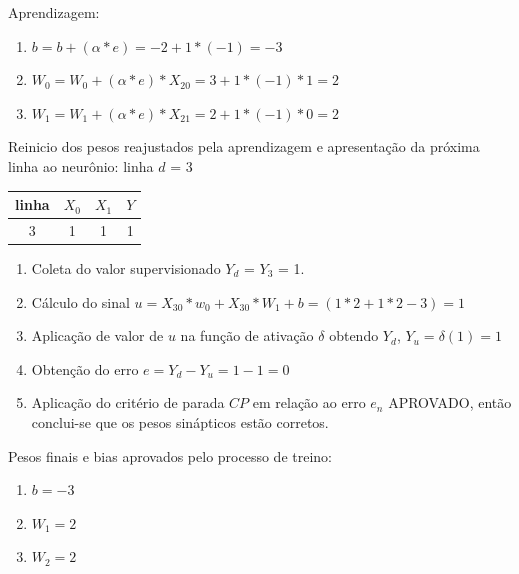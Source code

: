 \documentclass[	12pt, Times, openright, twoside, a4paper, english, brazil]{abntex2}
\begin{document}
            	
            	Aprendizagem:
            	\begin{enumerate}
            		\item $b=b+(\alpha*e) = -2 + 1*(-1) = -3 $  					
            		\item $W_0=W_0 + (\alpha*e)*X_{20} = 3 + 1*(-1)*1 = 2$ 
            		\item $W_1=W_1 + (\alpha*e)*X_{21}= 2 + 1*(-1)*0 = 2$
            	\end{enumerate}	
            	
            	Reinicio dos pesos reajustados pela aprendizagem e apresentação da próxima linha ao neurônio:
    				linha $d$ = 3\\
    				\begin{table}[!ht]
                    \centering
    				\begin{tabular}{|c|c|c|c|}
    					\hline  \textbf{linha} & \textbf{$X_0$} & \textbf{$X_1$} &  \textbf{$Y$}\\
  				 	    \hline 3 & 1 & 1 & 1\\ \hline
    				\end{tabular}
    				\end{table}
            	
            	\begin{enumerate}
            	    \item Coleta do valor supervisionado $Y_d$ = $Y_3$ = 1.
            		\item Cálculo do sinal $u = X_{30}*w_0 + X_{30}*W_1 +b = (1*2 + 1*2 -3) = 1$
            		\item Aplicação de valor de $u$ na função de ativação $\delta$ obtendo $Y_d$, $Y_u = \delta(1) = 1$
            		\item Obtenção do erro $e = Y_d-Y_u = 1 - 1 = 0$
            		\item Aplicação do critério de parada $CP$ em relação ao erro $e_n$ APROVADO, então conclui-se que os pesos sinápticos estão corretos.
            	\end{enumerate}
                
            	Pesos finais e bias aprovados pelo processo de treino:
            	\begin{enumerate}
            		\item $b=  -3$  					
            		\item $W_1= 2$ 
            		\item $W_2= 2$
            	\end{enumerate}	
            	
\end{document}
